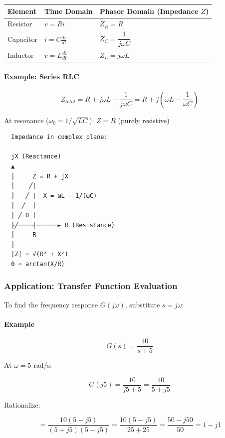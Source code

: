 \documentclass[11pt,a4paper]{book}
\begin{document}
\begin{center}
\begin{tabular}{|l|l|l|}
\hline
Element & Time Domain & Phasor Domain (Impedance $Z$) \\
\hline
Resistor & $v = Ri$ & $Z_R = R$ \\
Capacitor & $i = C \frac{dv}{dt}$ & $Z_C = \dfrac{1}{j\omega C}$ \\
Inductor & $v = L \frac{di}{dt}$ & $Z_L = j\omega L$ \\
\hline
\end{tabular}
\end{center}

\paragraph{Example: Series RLC}

\[Z_{total} = R + j\omega L + \frac{1}{j\omega C} = R + j\left(\omega L - \frac{1}{\omega C}\right)\]

At resonance ($\omega_0 = 1/\sqrt{LC}$): $Z = R$ (purely resistive)

\begin{lstlisting}
  Impedance in complex plane:
  
  jX (Reactance)
  ▲
  │     Z = R + jX
  │    ╱|
  │   ╱ |  X = ωL - 1/(ωC)
  │  ╱  |
  │ ╱ θ |
  ├╱────┤──────► R (Resistance)
  │     R
  │
  |Z| = √(R² + X²)
  θ = arctan(X/R)
\end{lstlisting}

\medskip\noindent\hrulefill\medskip

\subsubsection{Application: Transfer Function Evaluation}

To find the frequency response $G(j\omega)$, substitute $s = j\omega$:

\paragraph{Example}

\[G(s) = \frac{10}{s + 5}\]

At $\omega = 5$ rad/s:

\[G(j5) = \frac{10}{j5 + 5} = \frac{10}{5 + j5}\]

Rationalize:

\[= \frac{10(5 - j5)}{(5+j5)(5-j5)} = \frac{10(5-j5)}{25+25} = \frac{50 - j50}{50} = 1 - j1\]
\end{document}
